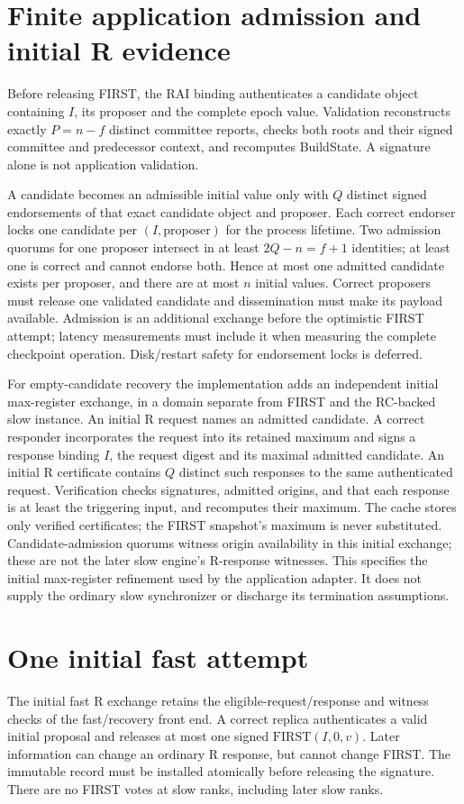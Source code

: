 \documentclass[11pt]{article}
\begin{document}
\section{Finite application admission and initial R evidence}
Before releasing FIRST, the RAI binding authenticates a candidate object containing
$I$, its proposer and the complete epoch value. Validation reconstructs exactly
$P=n-f$ distinct committee reports, checks both roots and their signed committee
and predecessor context, and recomputes BuildState. A signature alone is not
application validation.

A candidate becomes an admissible initial value only with $Q$ distinct signed
endorsements of that exact candidate object and proposer. Each correct endorser
locks one candidate per $(I,\mathrm{proposer})$ for the process lifetime. Two
admission quorums for one proposer intersect in at least $2Q-n=f+1$ identities;
at least one is correct and cannot endorse both. Hence at most one admitted
candidate exists per proposer, and there are at most $n$ initial values. Correct
proposers must release one validated candidate and dissemination must make its
payload available. Admission is an additional exchange before the optimistic
FIRST attempt; latency measurements must include it when measuring the complete
checkpoint operation. Disk/restart safety for endorsement locks is deferred.

For empty-candidate recovery the implementation adds an independent initial
max-register exchange, in a domain separate from FIRST and the RC-backed slow
instance. An initial R request names an admitted candidate. A correct responder
incorporates the request into its retained maximum and signs a response binding
$I$, the request digest and its maximal admitted candidate. An initial R
certificate contains $Q$ distinct such responses to the same authenticated
request. Verification checks signatures, admitted origins, and that each response
is at least the triggering input, and recomputes their maximum. The cache stores
only verified certificates; the FIRST snapshot's maximum is never substituted.
Candidate-admission quorums witness origin availability in this initial exchange;
these are not the later slow engine's R-response witnesses. This specifies the
initial max-register refinement used by the application adapter. It does not
supply the ordinary slow synchronizer or discharge its termination assumptions.

\section{One initial fast attempt}
The initial fast R exchange retains the eligible-request/response and witness
checks of the fast/recovery front end. A correct replica authenticates a valid
initial proposal and releases at most one signed $\mathrm{FIRST}(I,0,v)$.
Later information can change an ordinary R response, but cannot change FIRST.
The immutable record must be installed atomically before releasing the signature.
There are no FIRST votes at slow ranks, including later slow ranks.
\end{document}
